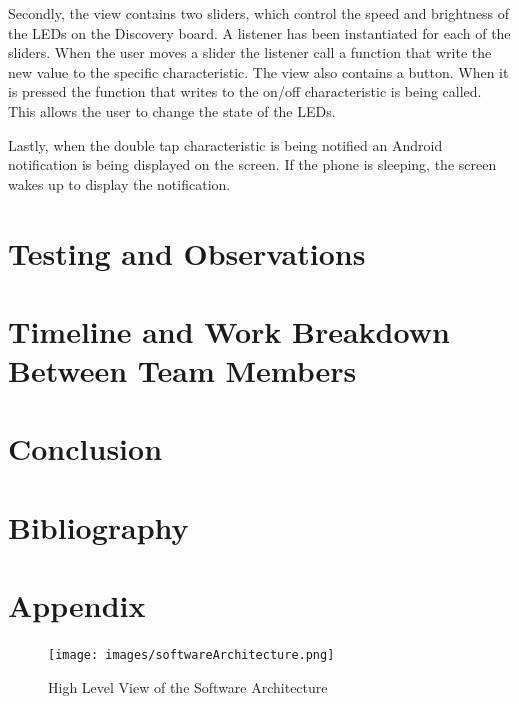 \documentclass[12pt]{article}
\begin{document}
Secondly, the view contains two sliders, which control the speed and brightness of the LEDs on the Discovery board. A listener has been instantiated for each of the sliders. When the user moves a slider the listener call a function that write the new value to the specific characteristic. The view also contains a button. When it is pressed the function that writes to the on/off characteristic is being called. This allows the user to change the state of the LEDs.

Lastly, when the double tap characteristic is being notified an Android notification is being displayed on the screen. If the phone is sleeping, the screen wakes up to display the notification.


\section{Testing and Observations}

\section{Timeline and Work Breakdown Between Team Members}

\section{Conclusion}

\newpage
\section{Bibliography}

%

\newpage
\section{Appendix}
\begin{figure}[!htb]
 \centering
 \texttt{[image: images/softwareArchitecture.png]}
 \caption{High Level View of the Software Architecture}
 \label{fig:softArch}
\end{figure}
\end{document}
